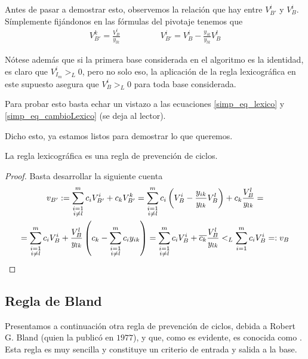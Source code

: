 Antes de pasar a demostrar esto, observemos la relación que hay entre $V_{B'}^i$ y $V_B^i$. Símplemente fijándonos en las fórmulas del pivotaje tenemos que
\begin{equation}
\label{simp_eq_cambioLexico}
	\begin{array}{cc}
		\displaystyle{V_{B'}^k=\frac{V_B^l}{y_{lk}}}\qquad&\qquad \displaystyle{V_{B'}^i=V_B^i-\frac{y_{ik}}{y_{lk}}V_B^l}
	\end{array}
\end{equation}
\begin{obs}[Positividad]
	Nótese además que si la primera base considerada en el algoritmo es la identidad, es claro que $V_{I_m}^i>_L0$, pero no solo eso, la aplicación de la regla lexicográfica en este supuesto asegura que $V_B^i>_L0$ para toda base considerada.
	
	Para probar esto basta echar un vistazo a las ecuaciones \eqref{simp_eq_lexico} y \eqref{simp_eq_cambioLexico} (se deja al lector).
\end{obs}
Dicho esto, ya estamos listos para demostrar lo que queremos.
\begin{prop}
	La regla lexicográfica es una regla de prevención de ciclos.
\end{prop}
\begin{proof}
	Basta desarrollar la siguiente cuenta
	\begin{multline*}
		v_{B'}:=\sum_{\substack{i=1\\i\not=l}}^{m}c_iV_{B'}^i+c_kV_{B'}^k=\sum_{\substack{i=1\\i\not=l}}^{m}c_i\left(V_B^i-\frac{y_{ik}}{y_{lk}}V_B^l\right)+c_k\frac{V_B^l}{y_{lk}}=\\=\sum_{\substack{i=1\\i\not=l}}^{m}c_iV_B^i+\frac{V_B^l}{y_{lk}}\left(c_k-\sum_{\substack{i=1\\i\not=l}}^{m}c_iy_{ik}\right)=\sum_{\substack{i=1\\i\not=l}}^{m}c_iV_B^i+\overline{c_k}\frac{V_B^l}{y_{lk}}<_L\sum_{i=1}^{m}c_iV_B^i=:v_B\qedhere
	\end{multline*}
\end{proof}
\subsection{Regla de Bland}
Presentamos a continuación otra regla de prevención de ciclos, debida a Robert G. Bland (quien la publicó en $1977$), y que, como es evidente, es conocida como . Esta regla es muy sencilla y constituye un criterio de entrada y salida a la base.

